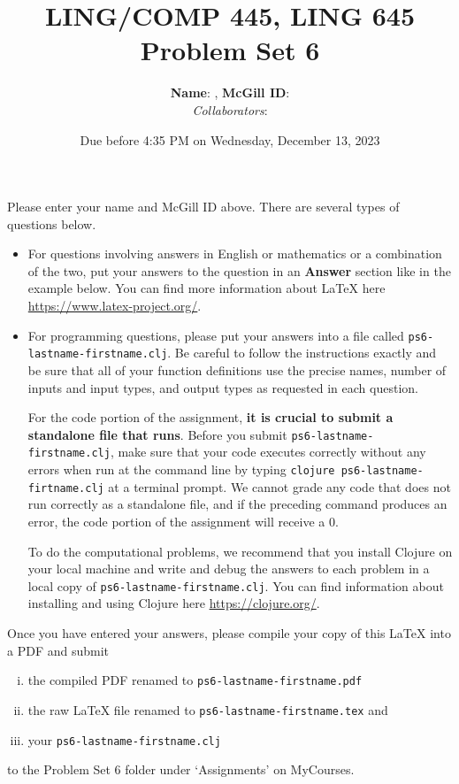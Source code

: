 \documentclass[10pt]{article}
\author{
  \textbf{Name}:       %
, \textbf{McGill ID}:  %
\\ \textit{Collaborators}:  %
}
\newcommand{\PSnum}{6}
\begin{document}
\title{LING/COMP 445, LING 645\\Problem Set \PSnum}
\date{Due before 4:35 PM on Wednesday, December 13, 2023}
\maketitle
Please enter your name and McGill ID above.
There are several types of questions below. 
\begin{itemize}
\item
For questions involving answers in English or mathematics or a
combination of the two, put your answers to the question in an
\textbf{Answer} section like in the example below. You can find more
information about \LaTeX{} here \url{https://www.latex-project.org/}.

\item For programming questions,
please put your answers into a file called
\texttt{ps\PSnum-lastname-firstname.clj}. Be careful to follow the instructions
exactly and be sure that all of your function definitions use the
precise names, number of inputs and input types, and output types as
requested in each question.

For the code portion of the assignment, \textbf{it is crucial to submit a
standalone file that runs}. Before you submit \texttt{ps\PSnum-lastname-firstname.clj}, 
make sure that your code executes correctly without any errors 
when run at the command line by typing 
\texttt{clojure ps\PSnum-lastname-firtname.clj} at a terminal
prompt. We cannot grade any code that does not run correctly as a
standalone file, and if the preceding command produces an error,
the code portion of the assignment will receive a $0$.

To do the computational problems, we recommend that you install
Clojure on your local machine and write and debug the answers to each
problem in a local copy of \texttt{ps\PSnum-lastname-firstname.clj}. You can
find information about installing and using Clojure here
\url{https://clojure.org/}.
\end{itemize}
Once you have entered your answers, please compile your copy of this
\LaTeX{} into a PDF and submit 
\begin{enumerate}[(i),noitemsep]
\item
the compiled PDF renamed to
\texttt{ps\PSnum-lastname-firstname.pdf} 
\item
the raw \LaTeX{} file renamed to
\texttt{ps\PSnum-lastname-firstname.tex} and 
\item
your \texttt{ps\PSnum-lastname-firstname.clj}
\end{enumerate}
to the Problem Set \PSnum{} folder under `Assignments' on MyCourses.
\end{document}
